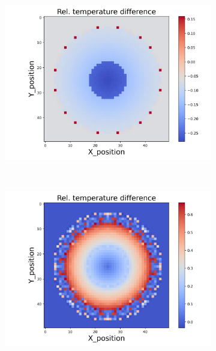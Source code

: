 \begin{figure}[h]
\begin{minipage}{\textwidth}
\begin{subfigure}{0.325\textwidth}
            \centering
            \includegraphics[width=\textwidth]{figures/raw_data/31/quad/T_bias.jpg}
        \end{subfigure}
    \end{minipage}\\
    \begin{minipage}{\textwidth}
        \centering
        \begin{subfigure}{0.325\textwidth}
            \centering
            \includegraphics[width=\textwidth]{figures/raw_data/32/quad/T_bias.jpg}
        \end{subfigure}
        \begin{subfigure}{0.325\textwidth}

\end{subfigure}
\end{minipage}
\end{figure}
